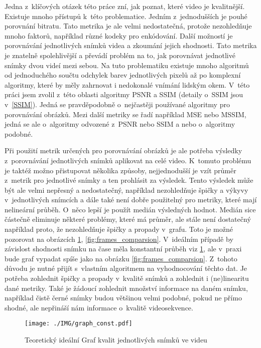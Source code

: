 \documentclass[thesis=M,czech]{FITthesis}[2016/06/26]
\begin{document}
Jedna z~klíčových otázek této práce zní, jak poznat, které video je kvalitnější. Existuje mnoho přístupů k~této problematice. Jedním z~jednodušších je pouhé porovnání bitratu. Tato metrika je ale velmi nedostatečná, protože nezohledňuje mnoho faktorů, například různé kodeky pro enkódování. Další možností je porovnávání jednotlivých snímků videa a zkoumání jejich shodnosti. Tato metrika je znatelně spolehlivější a převádí problém na to, jak porovnávat jednotlivé snímky dvou videí mezi sebou. Na tuto problematiku existuje mnoho algoritmů od jednoduchého součtu odchylek barev jednotlivých pixelů až po komplexní algoritmy, které by měly zahrnovat i nedokonalé vnímání lidským okem. V~této práci jsem zvolil z~této oblasti algoritmy PSNR a SSIM (detaily o~SSIM jsou v~\autoref{SSIM}). Jedná se pravděpodobně o~nejčastěji používané algoritmy pro porovnávání obrázků. Mezi další metriky se řadí například MSE nebo MSSIM, jedná se ale o~algoritmy odvozené z~PSNR nebo SSIM a nebo o~algoritmy podobné\cite{otherref}.

Při použití metrik určených pro porovnávání obrázků je ale potřeba výsledky z~porovnávání jednotlivých snímků aplikovat na celé video. K~tomuto problému je taktéž možno přistupovat několika způsoby, nejjednodušší je vzít průměr z~metrik pro jednotlivé snímky a ten prohlásit za výsledek. Tento výsledek může být ale velmi nepřesný a nedostatečný, například nezohledňuje špičky a výkyvy v~jednotlivých snímcích a dále také není dobře použitelný pro metriky, které mají nelineární průběh. O~něco lepší je použít medián výsledných hodnot. Medián sice částečně eliminuje některé problémy, které má průměr, ale stále není dostatečný například proto, že nezohledňuje špičky a propady v~grafu. Toto je možné pozorovat na obrázcích \ref{fig:theory_graph}, \ref{fig:frames_comparsion}. V~ideálním případě by závislost shodnosti snímku na čase měla konstantní průběh viz \ref{fig:theory_graph}, ale v~praxi bude graf vypadat spíše jako na obrázku \ref{fig:frames_comparsion}. Z~tohoto důvodu je nutné přijít s~vlastním algoritmem na vyhodnocování těchto dat. Je potřeba zohlednit špičky a propady v~kvalitě snímků a zohlednit i (ne)linearitu dané metriky. Také je žádoucí zohlednit množství informace na daném snímku, například čistě černé snímky budou většinou velmi podobné, pokud ne přímo shodné, ale nepřináší nám informace o~kvalitě videosekvence.

\begin{figure}\centering
\caption{Teoretický ideální Graf kvalit jednotlivých snímků ve videu}
\texttt{[image: ./IMG/graph\_const.pdf]}
\label{fig:theory_graph}
\end{figure}
\end{document}
